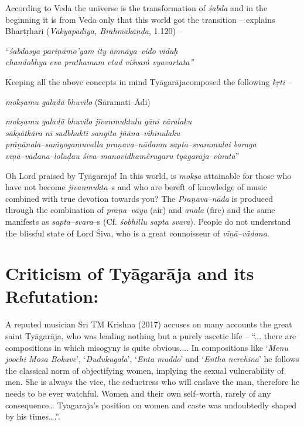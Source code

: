 According to Veda the universe is the transformation of \textit{śabda} and in the beginning it is from Veda only that this world got the transition – explains Bhartṛhari (\textit{Vākyapadīya, Brahmakāṇḍa}, 1.120) –

\begin{myquote}
“\textit{śabdasya pariṇāmo’yam ity āmnāya–vido viduḥ }\\\textit{chandobhya eva prathamam etad viśvaṁ vyavartata”} 
\end{myquote}

Keeping all the above concepts in mind Tyāgarājacomposed the following \textit{kṛti} –

\newpage

\textit{mokṣamu galadā bhuvilo} (Sāramati–Ādi)

\begin{myquote}
\textit{mokṣamu galadā bhuvilo jīvanmuktulu gāni vāralaku}\\\textit{sākṣātkāra nī sadbhakti sangīta jñāna–vihīnulaku}\\\textit{prāṇānala–saṁyogamuvalla praṇava–nādamu sapta–svaramulai baraga}\\\textit{vīṇā–vādana–loluḍau śiva–manovidhamêrugaru tyāgarāja–vinuta}”
\end{myquote}

Oh Lord praised by Tyāgarāja! In this world, is \textit{mokṣa} attainable for those who have not become \textit{jīvanmukta}–s and who are bereft of knowledge of music combined with true devotion towards you? The \textit{Praṇava–nāda} is produced through the combination of \textit{prāṇa–vāyu} (air) and \textit{anala} (fire) and the same manifests as \textit{sapta–svara}–s (Cf. \textit{śobhillu sapta svara}). People do not understand the blissful state of Lord Śiva, who is a great connoisseur of \textit{vīṇā–vādana}.


\section*{Criticism of Tyāgarāja and its Refutation:}

A reputed musician Sri TM Krishna (2017) accuses on many accounts the great saint Tyāgarāja, who was leading nothing but a purely ascetic life – “... there are compositions in which misogyny is quite obvious.... In compositions like ‘\textit{Menu joochi Mosa Bokave}’, ‘\textit{Dudukugala}’, ‘\textit{Enta muddo}’ and ‘\textit{Entha nerchina}’ he follows the classical norm of objectifying women, implying the sexual vulnerability of men. She is always the vice, the seductress who will enslave the man, therefore he needs to be ever watchful. Women and their own self–worth, rarely of any consequence… Tyagaraja’s position on women and caste was undoubtedly shaped by his times….”.

